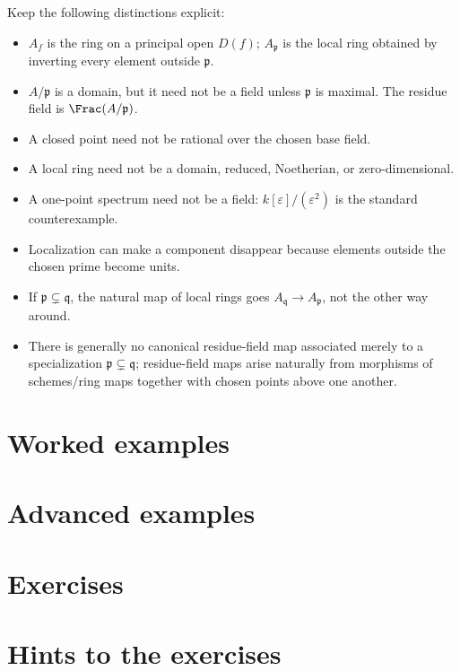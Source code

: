 Keep the following distinctions explicit:
\begin{itemize}
\item $A_f$ is the ring on a principal open $D(f)$; $A_{\mathfrak p}$ is the local ring
      obtained by inverting every element outside $\mathfrak p$.
\item $A/\mathfrak p$ is a domain, but it need not be a field unless $\mathfrak p$ is
      maximal.  The residue field is $\Frac(A/\mathfrak p)$.
\item A closed point need not be rational over the chosen base field.
\item A local ring need not be a domain, reduced, Noetherian, or zero-dimensional.
\item A one-point spectrum need not be a field: $k[\varepsilon]/(\varepsilon^2)$ is the
      standard counterexample.
\item Localization can make a component disappear because elements outside the chosen prime
      become units.
\item If $\mathfrak p\subsetneq\mathfrak q$, the natural map of local rings goes
      $A_{\mathfrak q}\to A_{\mathfrak p}$, not the other way around.
\item There is generally no canonical residue-field map associated merely to a specialization
      $\mathfrak p\subsetneq\mathfrak q$; residue-field maps arise naturally from morphisms of
      schemes/ring maps together with chosen points above one another.
\end{itemize}

\section{Worked examples}


\section{Advanced examples}


\section{Exercises}


\ifdefined\IncludeExerciseHints
\section*{Hints to the exercises}

\fi

